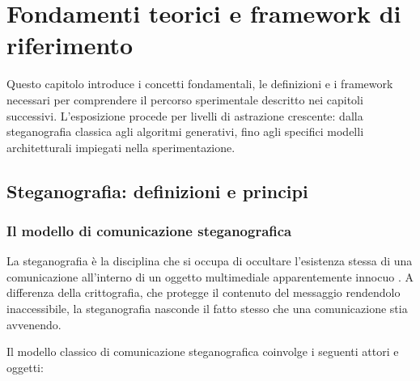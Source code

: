 
\chapter{Fondamenti teorici e framework di riferimento}\label{ch:fondamenti}

Questo capitolo introduce i concetti fondamentali, le definizioni e i framework necessari per comprendere il percorso sperimentale descritto nei capitoli successivi. L'esposizione procede per livelli di astrazione crescente: dalla steganografia classica agli algoritmi generativi, fino agli specifici modelli architetturali impiegati nella sperimentazione.

\section{Steganografia: definizioni e principi}

\subsection{Il modello di comunicazione steganografica}

La steganografia è la disciplina che si occupa di occultare l'esistenza stessa di una comunicazione all'interno di un oggetto multimediale apparentemente innocuo \cite{turch-2020}. A differenza della crittografia, che protegge il contenuto del messaggio rendendolo inaccessibile, la steganografia nasconde il fatto stesso che una comunicazione stia avvenendo.

Il modello classico di comunicazione steganografica coinvolge i seguenti attori e oggetti:

